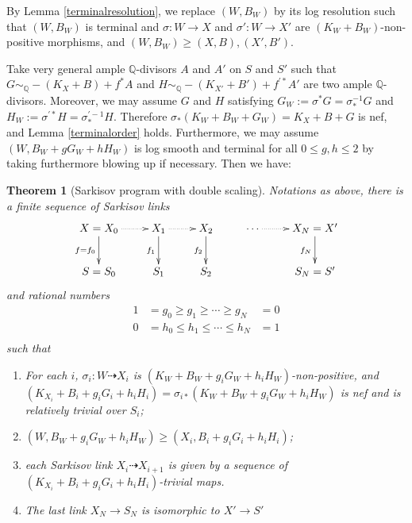 \documentclass{article}
\newtheorem{thm}[defn]{Theorem}
\begin{document}
By Lemma \ref{terminalresolution}, we  replace $(W,B_W)$ by its log resolution such that $(W,B_{W})$ is terminal and $\sigma:W\to X$ and $\sigma':W\to X'$ are $(K_W+B_W)$-non-positive morphisms, and $(W,B_W)\geqslant (X,B),(X',B')$. 

Take  very general ample $\mathbb{Q}$-divisors $ A $ and $ A' $ on $ S $ and $ S' $ such that $ G\sim_{\mathbb{Q}}-(K_X+B)+f^*A $ and $ H\sim_{\mathbb{Q}}-(K_{X'}+B')+f^{'*}A' $ are two ample $\mathbb{Q}$-divisors. Moreover, we may assume $ G $ and $ H $ satisfying $G_{W}:= \sigma^*G=\sigma^{-1}_*G $ and $ H_{W}:=\sigma^{'*}H=\sigma^{'-1}_*H $. Therefore $\sigma_{*}(K_{W}+B_{W}+G_{W})=K_{X}+B+G$ is nef, and Lemma \ref{terminalorder} holds.
Furthermore, we may assume $(W,B_W+gG_W+hH_W)$ is log smooth and terminal for all $0\leqslant g,h\leqslant 2$ by taking furthermore blowing up if necessary.
Then we have:
\begin{thm}[Sarkisov program with double scaling]\label{main2}
Notations as above, there is a finite sequence of Sarkisov links
\[
  \xymatrix{
    X=X_0\ar@{.>}[r]\ar[d]_{f=f_{0}}&X_{1}\ar@{.>}[r]\ar[d]_{f_{1}}& X_{2}\ar[d]_{f_{2}} &\cdots\ar@{.>}[r]&X_N=X'\ar[d]_{f_{N}} \\
    S=S_{0}&S_{1} &S_{2}&&S_N=S'
  }
\]
and rational numbers
\[
  \begin{aligned}
    1&=g_0\geqslant g_1 \geqslant \cdots \geqslant g_N&=0\\
    0&=h_0\leqslant h_{1} \leqslant \cdots \leqslant h_N&=1\\
  \end{aligned}
\]
such that 
\begin{enumerate}
  \item For each $i$, $\sigma_i:W\dashrightarrow  X_{i}$ is $(K_{W}+B_{W}+g_{i}G_{W}+h_{i}H_{W})$-non-positive, and $(K_{X_{i}}+B_{i}+g_{i}G_{i}+h_{i}H_{i})=\sigma_{i*}(K_{W}+B_{W}+g_{i}G_{W}+h_{i}H_{W})$ is nef and is relatively trivial over $S_{i}$;
  \item $(W,B_{W}+g_{i}G_{W}+h_{i}H_{W})\geqslant (X_{i},B_{i}+g_{i}G_{i}+h_{i}H_{i})$;
  \item each Sarkisov link $X_{i}\dashrightarrow X_{i+1}$ is given by a sequence of $(K_{X_{i}}+B_{i}+g_{i}G_{i}+h_{i}H_{i})$-trivial maps.
    \item  The last link $X_{N} \to S_{N}$ is isomorphic to $X'\to S'$
\end{enumerate}
\end{thm}
\end{document}
